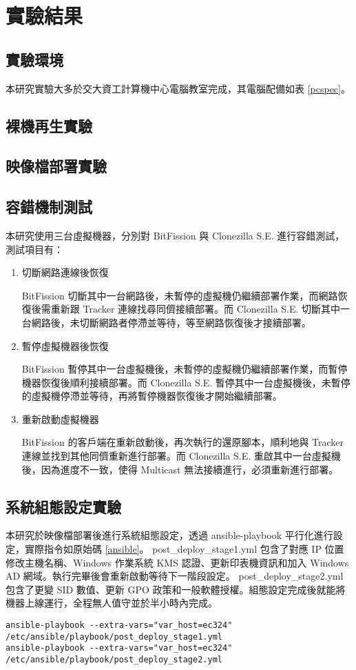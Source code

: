 \chapter{實驗結果}
\label{c:experiment}
\section{實驗環境}
本研究實驗大多於交大資工計算機中心電腦教室完成，其電腦配備如表 \ref{pcspec}。

\section{裸機再生實驗}


\section{映像檔部署實驗}



\section{容錯機制測試}
\label{faulttolerant}
本研究使用三台虛擬機器，分別對 BitFission 與 Clonezilla S.E. 進行容錯測試，測試項目有：
\begin{enumerate}
\item 切斷網路連線後恢復

BitFission 切斷其中一台網路後，未暫停的虛擬機仍繼續部署作業，而網路恢復後需重新跟 Tracker 連線找尋同儕接續部署。而 Clonezilla S.E. 切斷其中一台網路後，未切斷網路者停滯並等待，等至網路恢復後才接續部署。
\item 暫停虛擬機器後恢復

BitFission 暫停其中一台虛擬機後，未暫停的虛擬機仍繼續部署作業，而暫停機器恢復後順利接續部署。而 Clonezilla S.E. 暫停其中一台虛擬機後，未暫停的虛擬機停滯並等待，再將暫停機器恢復後才開始繼續部署。
\item 重新啟動虛擬機器

BitFission 的客戶端在重新啟動後，再次執行的還原腳本，順利地與 Tracker 連線並找到其他同儕重新進行部署。而 Clonezilla S.E. 重啟其中一台虛擬機後，因為進度不一致，使得 Multicast 無法接續進行，必須重新進行部署。
\end{enumerate}
\section{系統組態設定實驗}
本研究於映像檔部署後進行系統組態設定，透過 ansible-playbook 平行化進行設定，實際指令如原始碼 \ref{ansible}。
post\_deploy\_stage1.yml 包含了對應 IP 位置修改主機名稱、Windows 作業系統 KMS 認證、更新印表機資訊和加入 Windows AD 網域。執行完畢後會重新啟動等待下一階段設定。
post\_deploy\_stage2.yml 包含了更變 SID 數值、更新 GPO 政策和一般軟體授權。組態設定完成後就能將機器上線運行，全程無人值守並於半小時內完成。
\begin{lstlisting}[label={ansible},caption= Shell commands of ansible-playbook]
ansible-playbook --extra-vars="var_host=ec324" /etc/ansible/playbook/post_deploy_stage1.yml 
ansible-playbook --extra-vars="var_host=ec324" /etc/ansible/playbook/post_deploy_stage2.yml
\end{lstlisting}
